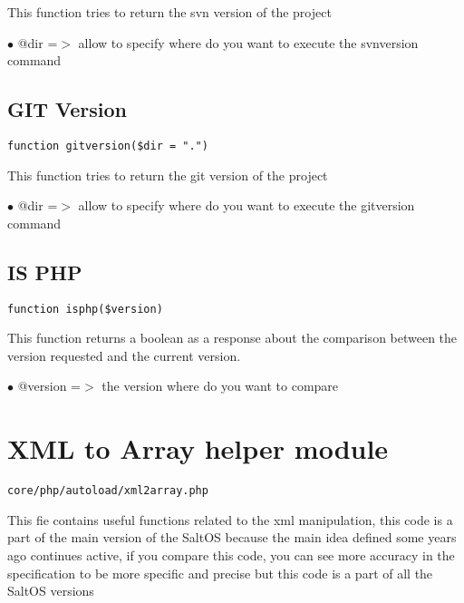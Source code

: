 \documentclass[a4paper]{book}
\begin{document}
This function tries to return the svn version of the project

\begin{compactitem}
\item[\color{myblue}$\bullet$] @dir =$>$ allow to specify where do you want to execute the svnversion command
\end{compactitem}

\hypertarget{toc275}{}
\subsection{GIT Version}

\begin{lstlisting}
function gitversion($dir = ".")
\end{lstlisting}

This function tries to return the git version of the project

\begin{compactitem}
\item[\color{myblue}$\bullet$] @dir =$>$ allow to specify where do you want to execute the gitversion command
\end{compactitem}

\hypertarget{toc276}{}
\subsection{IS PHP}

\begin{lstlisting}
function isphp($version)
\end{lstlisting}

This function returns a boolean as a response about the comparison between the
version requested and the current version.

\begin{compactitem}
\item[\color{myblue}$\bullet$] @version =$>$ the version where do you want to compare
\end{compactitem}

\hypertarget{toc277}{}
\section{XML to Array helper module}

\begin{lstlisting}
core/php/autoload/xml2array.php
\end{lstlisting}

This fie contains useful functions related to the xml manipulation, this code is a part of the
main version of the SaltOS because the main idea defined some years ago continues active, if you
compare this code, you can see more accuracy in the specification to be more specific and precise
but this code is a part of all the SaltOS versions
\end{document}

